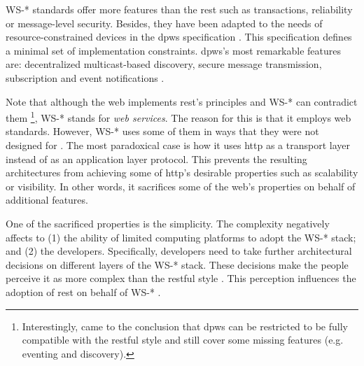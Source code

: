 WS-* standards offer more features than the \ac{rest} such as transactions, reliability or message-level security.
Besides, they have been adapted to the needs of resource-constrained devices in the \ac{dpws} specification .
This specification defines a minimal set of implementation constraints.
\ac{dpws}'s most remarkable features are: decentralized multicast-based discovery, secure message transmission, subscription and event notifications \citep{moritz_devices_2010}.


Note that although the web implements \ac{rest}'s principles and WS-* can contradict them
\footnote{Interestingly, \citet{moritz_devices_2010} came to the conclusion that \ac{dpws} can be restricted to be fully compatible with the \ac{rest}ful style and still cover some missing features (e.g. eventing and discovery).},
WS-* stands for \emph{web services}. %
The reason for this is that it employs web standards. %
However, WS-* uses some of them in ways that they were not designed for \citep{krummenacher_www_2005}.
The most paradoxical case is how it uses \ac{http} as a transport layer instead of as an application layer protocol.
This prevents the resulting architectures from achieving some of \ac{http}'s desirable properties such as scalability or visibility.
In other words, it sacrifices some of the web's properties on behalf of additional features.


One of the sacrificed properties is the simplicity.
The complexity negatively affects to
(1) the ability of limited computing platforms to adopt the WS-* stack; and %
(2) the developers.
Specifically, developers need to take further architectural decisions on different layers of the WS-* stack.
These decisions make the people perceive it as more complex than the \ac{rest}ful style \citep{guinard_search_2011}.
This perception influences the adoption of \ac{rest} on behalf of WS-* \citep{davis_perceived_1989,legris_why_2003}.


